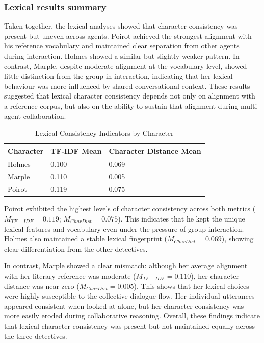 \documentclass{article}
\begin{document}
\subsubsection{Lexical results summary}

Taken together, the lexical analyses showed that character consistency was present but uneven across agents. Poirot achieved the strongest alignment with his reference vocabulary and maintained clear separation from other agents during interaction. Holmes showed a similar but slightly weaker pattern. In contrast, Marple, despite moderate alignment at the vocabulary level, showed little distinction from the group in interaction, indicating that her lexical behaviour was more influenced by shared conversational context. These results suggested that lexical character consistency depends not only on alignment with a reference corpus, but also on the ability to sustain that alignment during multi-agent collaboration.

\begin{table}[H]
\centering
\begin{tabular}{l l l}\toprule
Character & TF-IDF Mean & Character Distance Mean \\\midrule
Holmes & 0.100 & 0.069 \\
Marple & 0.110 & 0.005 \\
Poirot & 0.119 & 0.075 \\ \bottomrule
\end{tabular}
\caption{Lexical Consistency Indicators by Character}
\label{lexical_summary}
\end{table}

Poirot exhibited the highest levels of character consistency across both metrics ($M_{TF-IDF}=0.119$; $M_{CharDist}=0.075$). This indicates that he kept the unique lexical features and vocabulary even under the pressure of group interaction. Holmes also maintained a stable lexical fingerprint ($M_{CharDist}=0.069$), showing clear differentiation from the other detectives.

In contrast, Marple showed a clear mismatch: although her average alignment with her literary reference was moderate ($M_{TF-IDF}=0.110$), her character distance was near zero ($M_{CharDist}=0.005$). This shows that her lexical choices were highly susceptible to the collective dialogue flow. Her individual utterances appeared consistent when looked at alone, but her character consistency was more easily eroded during collaborative reasoning. Overall, these findings indicate that lexical character consistency was present but not maintained equally across the three detectives.
\end{document}
